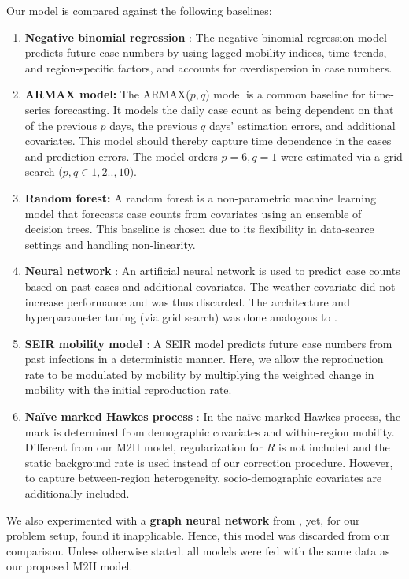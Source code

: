 \documentclass[sigconf, review = false, nonacm = true]{acmart}
\newcommand\modelNoWhitespace{M2H model\xspace}
\begin{document}
Our model is compared against the following baselines:
\begin{enumerate}
  \item \textbf{Negative binomial regression} \cite{persson_monitoring_2021}:
    The negative binomial regression model predicts future case numbers by using lagged mobility indices, time trends, and region-specific factors, and accounts for overdispersion in case numbers.
    \item \textbf{ARMAX model:} The ARMAX($p,q$) model is a common baseline for time-series forecasting. It models the daily case count as being dependent on that of the previous $p$ days, the previous $q$ days' estimation errors, and additional covariates. This model should thereby capture time dependence in the cases and prediction errors. The model orders $p = 6, q = 1$ were estimated via a grid search ($p, q \in 1,2..,10$).
    \item \textbf{Random forest:} A random forest is a non-parametric machine learning model that forecasts case counts from covariates using an ensemble of decision trees. This baseline is chosen due to its flexibility in data-scarce settings and handling non-linearity.
    \item \textbf{Neural network} \cite{wieczorek_neural_2020}: An artificial neural network is used to predict case counts based on past cases and additional covariates. The weather covariate did not increase performance and was thus discarded. The architecture and hyperparameter tuning (via grid search) was done analogous to \cite{wieczorek_neural_2020}.
    \item \textbf{SEIR mobility model \cite{kermack_contribution_1927}}: A SEIR model predicts future case numbers from past infections in a deterministic manner. Here, we allow the reproduction rate to be modulated by mobility by multiplying the weighted change in mobility with the initial reproduction rate. 
    \item \textbf{Na\"ive marked Hawkes process} \cite{chiang_hawkes_2020}: In the na\"ive marked Hawkes process, the mark is determined from demographic covariates and within-region mobility. Different from our \modelNoWhitespace, regularization for $R$ is not included and the static background rate is used instead of our correction procedure. However, to capture between-region heterogeneity, socio-demographic covariates are additionally included.
\end{enumerate}
We also experimented with a \textbf{graph neural network} from \cite{kapoor_examining_2020}, yet, for our problem setup, found it inapplicable. Hence, this model was discarded from our comparison. Unless otherwise stated. all models were fed with the same data as our proposed \modelNoWhitespace. 
\end{document}

